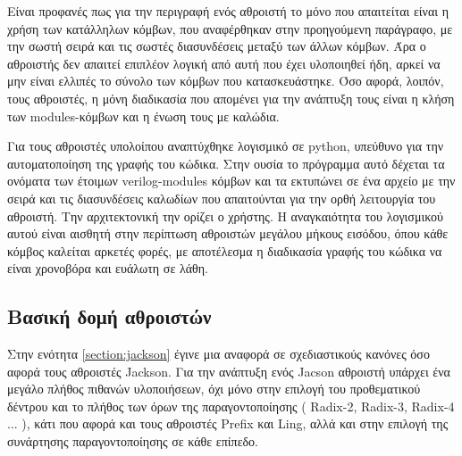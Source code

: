 Είναι προφανές πως για την περιγραφή ενός αθροιστή το μόνο που απαιτείται είναι η χρήση των
κατάλληλων κόμβων, που αναφέρθηκαν στην προηγούμενη παράγραφο, με την σωστή σειρά και τις σωστές 
διασυνδέσεις μεταξύ των άλλων κόμβων. Άρα ο αθροιστής δεν απαιτεί επιπλέον λογική από αυτή που
έχει υλοποιηθεί ήδη, αρκεί να μην είναι ελλιπές το σύνολο των κόμβων που κατασκευάστηκε.
Όσο αφορά, λοιπόν, τους αθροιστές, η μόνη διαδικασία που απομένει για την ανάπτυξη τους είναι
η κλήση των modules-κόμβων και η ένωση τους με καλώδια. 

Για τους αθροιστές υπολοίπου αναπτύχθηκε λογισμικό σε python, υπεύθυνο για την αυτοματοποίηση 
της γραφής του κώδικα. Στην ουσία το πρόγραμμα αυτό δέχεται τα ονόματα των έτοιμων 
verilog-modules κόμβων και τα εκτυπώνει σε ένα αρχείο με την σειρά και τις διασυνδέσεις
καλωδίων που απαιτούνται για την ορθή λειτουργία του αθροιστή. Την αρχιτεκτονική την ορίζει
ο χρήστης. Η αναγκαιότητα του λογισμικού αυτού είναι αισθητή στην περίπτωση αθροιστών μεγάλου 
μήκους εισόδου, όπου κάθε κόμβος καλείται αρκετές φορές, με αποτέλεσμα η διαδικασία γραφής του 
κώδικα να είναι χρονοβόρα και ευάλωτη σε λάθη.



\subsection{Βασική δομή αθροιστών}

Στην ενότητα \ref{section:jackson} έγινε μια αναφορά σε σχεδιαστικούς κανόνες όσο αφορά τους 
αθροιστές Jackson. Για την ανάπτυξη ενός Jacson αθροιστή υπάρχει ένα μεγάλο πλήθος πιθανών υλοποιήσεων,
όχι μόνο στην επιλογή του προθεματικού δέντρου και το πλήθος των όρων της παραγοντοποίησης ( Radix-2, 
Radix-3, Radix-4 ... ), κάτι που αφορά και τους αθροιστές Prefix και Ling, αλλά 
και στην επιλογή της συνάρτησης παραγοντοποίησης σε κάθε επίπεδο.

